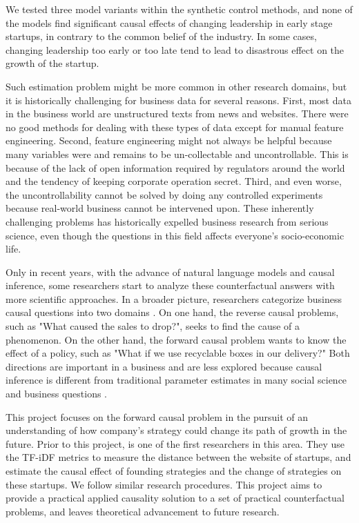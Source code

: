 \documentclass[12pt]{article}
\begin{document}
We tested three model variants within the synthetic control methods, and none of the models find significant causal effects of changing leadership in early stage startups, in contrary to the common belief of the industry. In some cases, changing leadership too early or too late tend to lead to disastrous effect on the growth of the startup.

Such estimation problem might be more common in other research domains, but it is historically challenging for business data for several reasons. First, most data in the business world are unstructured texts from news and websites. There were no good methods for dealing with these types of data except for manual feature engineering. Second, feature engineering might not always be helpful because many variables were and remains to be un-collectable and uncontrollable. This is because of the lack of open information required by regulators around the world and the tendency of keeping corporate operation secret. Third, and even worse, the uncontrollability cannot be solved by doing any controlled experiments because real-world business cannot be intervened upon. These inherently challenging problems has historically expelled business research from serious science, even though the questions in this field affects everyone's socio-economic life.

Only in recent years, with the advance of natural language models and causal inference, some researchers start to analyze these counterfactual answers with more scientific approaches. In a broader picture, researchers categorize business causal questions into two domains \cite{gelman2013ask}. On one hand, the reverse causal problems, such as "What caused the sales to drop?", seeks to find the cause of a phenomenon. On the other hand, the forward causal problem wants to know the effect of a policy, such as "What if we use recyclable boxes in our delivery?" Both directions are important in a business and are less explored because causal inference is different from traditional parameter estimates in many social science and business questions \cite{athey2015machine}.

This project focuses on the forward causal problem in the pursuit of an understanding of how company's strategy could change its path of growth in the future. Prior to this project, \cite{guzman2021treatment} is one of the first researchers in this area. They use the TF-iDF metrics to measure the distance between the website of startups, and estimate the causal effect of founding strategies and the change of strategies on these startups. We follow similar research procedures. This project aims to provide a practical applied causality solution to a set of practical counterfactual problems, and leaves theoretical advancement to future research.
\end{document}
